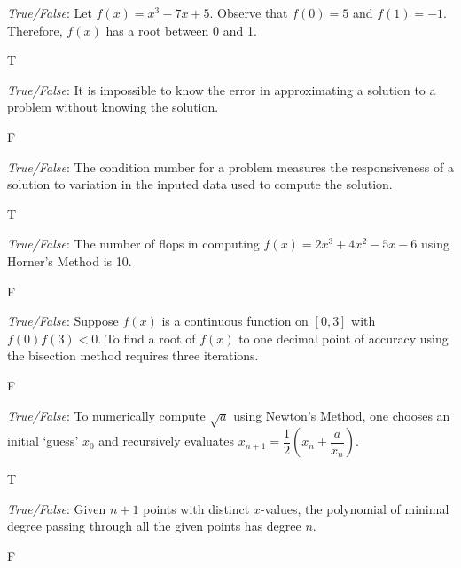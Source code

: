 \documentclass[11pt,letterpaper]{article}
\begin{document}
\thispagestyle{title}


\quizsol \textit{True/False}: Let $f(x)= x^3 - 7x + 5$. Observe that $f(0)= 5$ and $f(1)= -1$. Therefore, $f(x)$ has a root between 0 and 1. \pspace

\sol T


\quizsol \textit{True/False}: It is impossible to know the error in approximating a solution to a problem without knowing the solution. \pspace

\sol F

\quizsol \textit{True/False}: The condition number for a problem measures the responsiveness of a solution to variation in the inputed data used to compute the solution. \pspace

\sol T


\quizsol \textit{True/False}: The number of flops in computing $f(x)= 2x^3 + 4x^2 - 5x - 6$ using Horner's Method is 10. \pspace

\sol F


\quizsol \textit{True/False}: Suppose $f(x)$ is a continuous function on $[0, 3]$ with $f(0)f(3) < 0$. To find a root of $f(x)$ to one decimal point of accuracy using the bisection method requires three iterations. \pspace

\sol F



\quizsol \textit{True/False}: To numerically compute $\sqrt{a}$ using Newton's Method, one chooses an initial `guess' $x_0$ and recursively evaluates $x_{n+1}= \dfrac{1}{2} \left( x_n + \dfrac{a}{x_n} \right)$.

T


\quizsol \textit{True/False}: Given $n + 1$ points with distinct $x$-values, the polynomial of minimal degree passing through all the given points has degree $n$.

F
\end{document}
